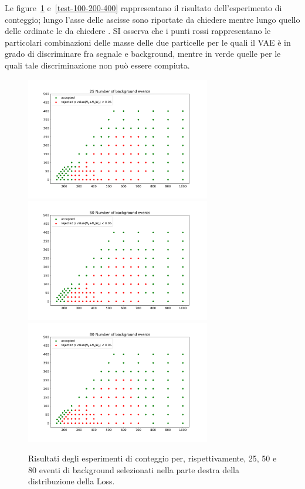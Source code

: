 Le figure~\ref{test-25-50-80} e~\ref{test-100-200-400} rappresentano il risultato dell'esperimento di conteggio; lungo l'asse delle ascisse sono riportate \color{red} da chiedere \color{black} mentre lungo quello delle ordinate le \color{red} da chiedere \color{black}. SI osserva che i punti rossi rappresentano le particolari combinazioni delle masse delle due particelle per le quali il VAE è in grado di discriminare fra segnale e background, mentre in verde quelle per le quali tale discriminazione non può essere compiuta.

\newpage

\begin{figure}[h!]
	\centering
	\includegraphics[width=0.72\textwidth]{figs/risultati_simulazione/25.pdf}
	\includegraphics[width=0.72\textwidth]{figs/risultati_simulazione/50.pdf}
	\includegraphics[width=0.72\textwidth]{figs/risultati_simulazione/80.pdf}
	\caption{Risultati degli esperimenti di conteggio per, rispettivamente, 25, 50 e 80 eventi di background selezionati nella parte destra della distribuzione della Loss.}
	\label{test-25-50-80}
\end{figure}
